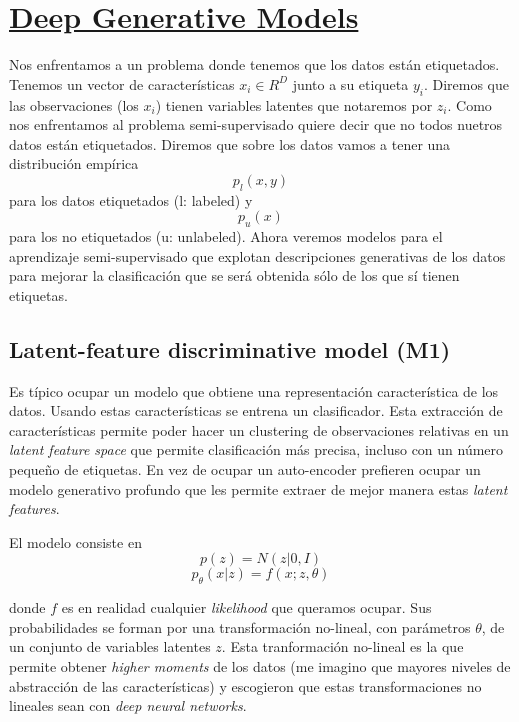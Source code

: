 \documentclass[letterpaper,11pt]{article} %
\begin{document}
\section{\href{https://arxiv.org/abs/1406.5298}{Deep Generative Models}}

Nos enfrentamos a un problema donde tenemos que los datos están etiquetados. Tenemos un vector de características $x_{i} \in R^{D}$ junto a su etiqueta $y_{i}$. Diremos que las observaciones (los $x_{i}$) tienen variables latentes que notaremos por $z_{i}$.  
Como nos enfrentamos al problema semi-supervisado quiere decir que no todos nuetros datos están etiquetados. Diremos que sobre los datos vamos a tener una distribución empírica
$$ p_{l}(x,y) $$
para los datos etiquetados (l: labeled) y
$$ p_{u}(x) $$
para los no etiquetados (u: unlabeled).  
Ahora veremos modelos para el aprendizaje semi-supervisado que explotan descripciones generativas de los datos para mejorar la clasificación que se será obtenida sólo de los que sí tienen etiquetas.

\subsection{Latent-feature discriminative model (M1)}

	Es típico ocupar un modelo que obtiene una representación característica de los datos. Usando estas características se entrena un clasificador.  
	Esta extracción de características permite poder hacer un clustering de observaciones relativas en un \textit{latent feature space} que permite clasificación más precisa, incluso con un número pequeño de etiquetas.  
	En vez de ocupar un auto-encoder prefieren ocupar un modelo generativo profundo que les permite extraer de mejor manera estas \textit{latent features}.
	
	El modelo consiste en
	$$ p(z) = N(z|0,I) $$
	$$ p_{\theta}(x|z) = f(x;z,\theta) $$
	
	donde $f$ es en realidad cualquier \textit{likelihood} que queramos ocupar. Sus probabilidades se forman por una transformación no-lineal, con parámetros $\theta$, de un conjunto de variables latentes $z$.  
	Esta tranformación no-lineal es la que permite obtener \textit{higher moments} de los datos (me imagino que mayores niveles de abstracción de las características) y escogieron que estas transformaciones no lineales sean con \textit{deep neural networks}.  
	
\end{document}
